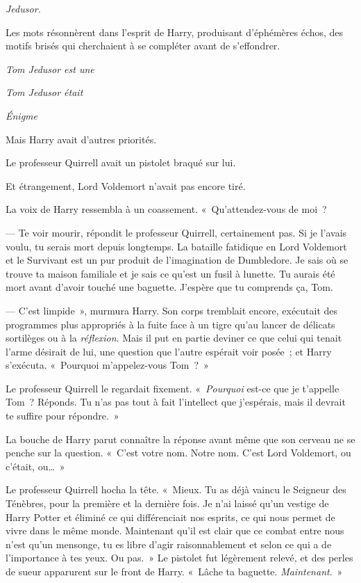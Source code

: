 
 \emph{Jedusor.}

\hplettrineextrapara
Les mots résonnèrent dans l'esprit de Harry, produisant d'éphémères échos, des motifs brisés qui cherchaient à se compléter avant de s'effondrer.

\emph{Tom Jedusor est une}

\emph{Tom Jedusor était}

\emph{Énigme}

Mais Harry avait d'autres priorités.

Le professeur Quirrell avait un pistolet braqué sur lui.

Et étrangement, Lord Voldemort n'avait pas encore tiré.

La voix de Harry ressembla à un coassement.
«~Qu'attendez-vous de moi~?

--- Te voir mourir, répondit le professeur Quirrell, certainement pas.
Si je l'avais voulu, tu serais mort depuis longtemps.
La bataille fatidique en Lord Voldemort et le Survivant est un pur produit de l'imagination de Dumbledore.
Je sais où se trouve ta maison familiale et je sais ce qu'est un fusil à lunette.
Tu aurais été mort avant d'avoir touché une baguette.
J'espère que tu comprends ça, Tom.

--- C'est limpide~», murmura Harry.
Son corps tremblait encore, exécutait des programmes plus appropriés à la fuite face à un tigre qu'au lancer de délicats sortilèges ou à la \emph{réflexion}.
Mais il put en partie deviner ce que celui qui tenait l'arme désirait de lui, une question que l'autre espérait voir posée~; et Harry s'exécuta.
«~Pourquoi m'appelez-vous Tom~?~»

Le professeur Quirrell le regardait fixement.
«~\emph{Pourquoi} est-ce que je t'appelle Tom~?
Réponds.
Tu n'as pas tout à fait l'intellect que j'espérais, mais il devrait te suffire pour répondre.~»

La bouche de Harry parut connaître la réponse avant même que son cerveau ne se penche sur la question.
«~C'est votre nom.
Notre nom.
C'est Lord Voldemort, ou c'était, ou…~»

Le professeur Quirrell hocha la tête.
«~Mieux.
Tu as déjà vaincu le Seigneur des Ténèbres, pour la première et la dernière fois.
Je n'ai laissé qu'un vestige de Harry Potter et éliminé ce qui différenciait nos esprits, ce qui nous permet de vivre dans le même monde.
Maintenant qu'il est clair que ce combat entre nous n'est qu'un mensonge, tu es libre d'agir raisonnablement et selon ce qui a de l'importance à tes yeux.
Ou pas.~» Le pistolet fut légèrement relevé, et des perles de sueur apparurent sur le front de Harry.
«~Lâche ta baguette.
\emph{Maintenant}.~»


